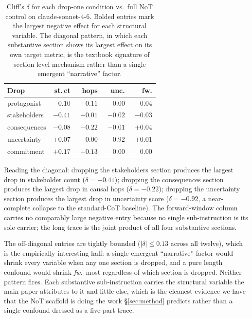\documentclass[11pt]{article}
\begin{document}
\begin{table}[!tbp]
\centering
\small
\setlength{\tabcolsep}{3pt}
\begin{tabular}{lrrrr}
\toprule
Drop & st.\,ct & hops & unc. & fw. \\
\midrule
protagonist  & $-0.10$           & $+0.11$           & $\phantom{-}0.00$ & $-0.04$ \\
stakeholders & $\mathbf{-0.41}$  & $+0.01$           & $-0.02$           & $-0.03$ \\
consequences & $-0.08$           & $\mathbf{-0.22}$  & $-0.01$           & $+0.04$ \\
uncertainty  & $+0.07$           & $\phantom{-}0.00$ & $\mathbf{-0.92}$  & $+0.01$ \\
commitment   & $+0.17$           & $+0.13$           & $\phantom{-}0.00$ & $\phantom{-}0.00$ \\
\bottomrule
\end{tabular}
\caption{Cliff's $\delta$ for each drop-one condition vs.\ full NoT
control on claude-sonnet-4-6. Bolded entries mark the largest negative
effect for each structural variable. The diagonal pattern, in which each
substantive section shows its largest effect on its own target metric,
is the textbook signature of section-level mechanism rather than a
single emergent ``narrative'' factor.}
\label{tab:ablation_full}
\end{table}

Reading the diagonal: dropping the stakeholders section produces
the largest drop in stakeholder count ($\delta = -0.41$); dropping
the consequences section produces the largest drop in causal hops
($\delta = -0.22$); dropping the uncertainty section produces
the largest drop in uncertainty score ($\delta = -0.92$, a
near-complete collapse to the standard-CoT baseline). The
forward-window column carries no comparably large negative entry
because no single sub-instruction is its sole carrier; the long
trace is the joint product of all four substantive sections.

The off-diagonal entries are tightly bounded ($|\delta| \le 0.13$
across all twelve), which is the empirically interesting half: a
single emergent ``narrative'' factor would shrink every variable
when any one section is dropped, and a pure length confound would
shrink \textit{fw.}\ most regardless of which section is dropped.
Neither pattern fires. Each substantive sub-instruction carries
the structural variable the main paper attributes to it and
little else, which is the cleanest evidence we have that the
NoT scaffold is doing the work \S\ref{sec:method} predicts
rather than a single confound dressed as a five-part trace.
\end{document}
